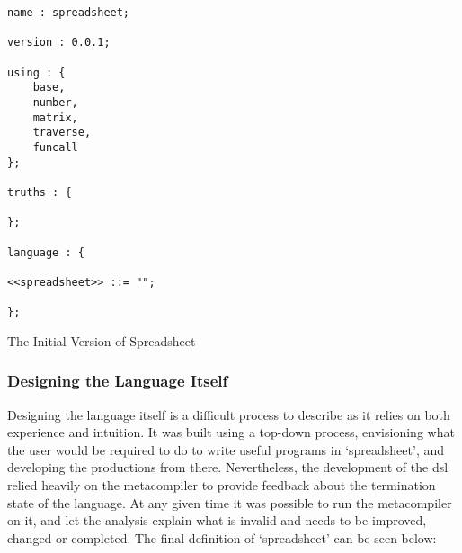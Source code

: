 \begin{listing}[!htb]
\begin{verbatim}
name : spreadsheet;

version : 0.0.1;

using : {
    base,
    number,
    matrix,
    traverse,
    funcall
};

truths : {

};

language : {

<<spreadsheet>> ::= "";

};
\end{verbatim}
\caption{The Initial Version of Spreadsheet}
\label{lst:the_initial_version_of_spreadsheet}
\end{listing}


\subsubsection{Designing the Language Itself} %
\label{ssub:designing_the_language_itself}
Designing the language itself is a difficult process to describe as it relies on both experience and intuition. 
It was built using a top-down process, envisioning what the user would be required to do to write useful programs in `spreadsheet', and developing the productions from there.
Nevertheless, the development of the \gls{dsl} relied heavily on the metacompiler to provide feedback about the termination state of the language. 
At any given time it was possible to run the metacompiler on it, and let the analysis explain what is invalid and needs to be improved, changed or completed. 
The final definition of `spreadsheet' can be seen below:


